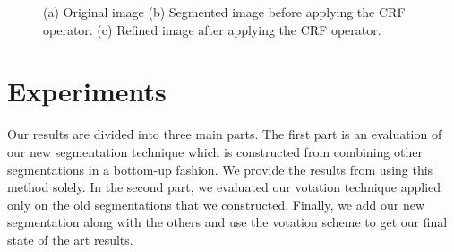 \documentclass[twoside,11pt]{article}
\begin{document}
\begin{figure}[!t]
\centering
{}
\caption{(a) Original image (b) Segmented image before applying the CRF
operator. (c) Refined image after applying the CRF operator.}
\label{fig:crf}
\end{figure}

\section{Experiments}

Our results are divided into three main parts. The first part is an evaluation of
our new segmentation technique which is constructed from combining other segmentations
in a bottom-up fashion. We provide the results from using this method solely. In the
second part, we evaluated our votation technique applied only on the old
segmentations that we constructed. Finally, we add our new segmentation along
with the others and use the
votation scheme to get our final state of the art results.
\end{document}
